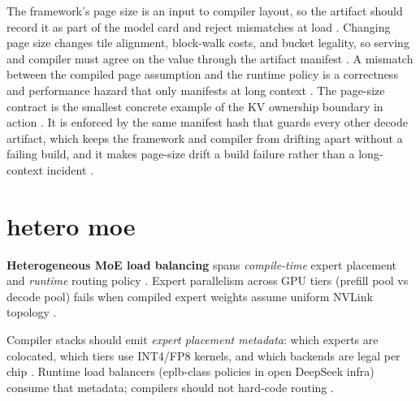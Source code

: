 The framework's page size is an input to compiler layout, so the artifact should record it as part of the model card and reject mismatches at load \citep{kwon2023vllm,chen2020compilerbasedhardw,memoryfloor2026}. Changing page size changes tile alignment, block-walk costs, and bucket legality, so serving and compiler must agree on the value through the artifact manifest \citep{patel2025llminference,taxbreak2026}. A mismatch between the compiled page assumption and the runtime policy is a correctness and performance hazard that only manifests at long context \citep{memoryfloor2026,patel2025llminference}. The page-size contract is the smallest concrete example of the KV ownership boundary in action \citep{kwon2023vllm,chen2020compilerbasedhardw}.
It is enforced by the same manifest hash that guards every other decode artifact, which keeps the framework and compiler from drifting apart without a failing build, and it makes page-size drift a build failure rather than a long-context incident \citep{chen2020compilerbasedhardw,memoryfloor2026}.

\section{hetero moe}
\label{sec:ch23_hetero_moe}

\textbf{Heterogeneous MoE load balancing} spans \emph{compile-time} expert placement and \emph{runtime} routing policy \citep{liu2024deepseekv3,patel2025llminference,chen2020compilerbasedhardw,yirage2026,amd2024xdna,amd2024aie,dlbook,kwon2023vllm,taxbreak2026,memoryfloor2026,semianalysis2024tma,dao2022flashattention,dao2023flashdecoding,nvidia2024cudagraphs,nvidia2022hopper}. Expert parallelism across GPU tiers (prefill pool vs decode pool) fails when compiled expert weights assume uniform NVLink topology \citep{patel2025llminference,liu2024deepseekv3,yirage2026,chen2020compilerbasedhardw,kwon2023vllm,taxbreak2026,memoryfloor2026,amd2024aie,dlbook,semianalysis2024tma,amd2024xdna,dao2022flashattention,dao2023flashdecoding,nvidia2024cudagraphs,nvidia2022hopper}.

Compiler stacks should emit \emph{expert placement metadata}: which experts are colocated, which tiers use INT4/FP8 kernels, and which backends are legal per chip \citep{liu2024deepseekv3,yirage2026,chen2020compilerbasedhardw,patel2025llminference,kwon2023vllm,taxbreak2026,memoryfloor2026,amd2024aie,dlbook,semianalysis2024tma,amd2024xdna,dao2022flashattention,dao2023flashdecoding,nvidia2024cudagraphs,nvidia2022hopper,amd2024xdna}. Runtime load balancers (eplb-class policies in open DeepSeek infra) consume that metadata; compilers should not hard-code routing \citep{liu2024deepseekv3,patel2025llminference,yirage2026,chen2020compilerbasedhardw,kwon2023vllm,taxbreak2026,memoryfloor2026,amd2024aie,dlbook,semianalysis2024tma,amd2024xdna,dao2022flashattention,dao2023flashdecoding,nvidia2024cudagraphs,nvidia2022hopper}.


